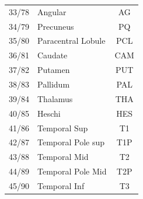 \documentclass[fleqn,10pt]{wlpeerj}
\begin{document}
\begin{table}[htbp]
\begin{tabular}{l | l | c}
33/78 & Angular               &   AG\\
34/79 & Precuneus             &   PQ\\
35/80 & Paracentral Lobule    & PCL\\
36/81 & Caudate               & CAM\\
37/82 & Putamen               & PUT\\
38/83 & Pallidum              &  PAL\\
39/84 & Thalamus              & THA\\
40/85 & Heschi                &  HES\\
41/86 & Temporal Sup          &    T1\\
42/87 & Temporal Pole sup     &  T1P\\
43/88 & Temporal Mid          &    T2\\
44/89 & Temporal Pole Mid     &  T2P\\
45/90 & Temporal Inf          &    T3\\
\hline  
  \hline 
                      
\end{tabular}
\end{table}
\end{document}
